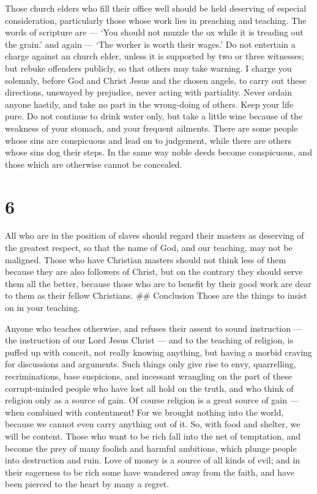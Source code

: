  Those church elders who fill their office well should be
held deserving of especial consideration, particularly those whose work
lies in preaching and teaching.  The words of scripture are
--- `You should not muzzle the ox while it is treading out the grain.'
and again --- `The worker is worth their wages.'  Do not
entertain a charge against an church elder, unless it is supported by
two or three witnesses;  but rebuke offenders publicly, so
that others may take warning.  I charge you solemnly,
before God and Christ Jesus and the chosen angels, to carry out these
directions, unswayed by prejudice, never acting with partiality.
 Never ordain anyone hastily, and take no part in the
wrong-doing of others. Keep your life pure.  Do not
continue to drink water only, but take a little wine because of the
weakness of your stomach, and your frequent ailments. 
There are some people whose sins are conspicuous and lead on to
judgement, while there are others whose sins dog their steps.
 In the same way noble deeds become conspicuous, and those
which are otherwise cannot be concealed.

\hypertarget{section-5}{%
\section{6}\label{section-5}}

 All who are in the position of slaves should regard their
masters as deserving of the greatest respect, so that the name of God,
and our teaching, may not be maligned.  Those who have
Christian masters should not think less of them because they are also
followers of Christ, but on the contrary they should serve them all the
better, because those who are to benefit by their good work are dear to
them as their fellow Christians. \#\# Conclusion Those are the things to
insist on in your teaching.

 Anyone who teaches otherwise, and refuses their assent to
sound instruction --- the instruction of our Lord Jesus Christ --- and
to the teaching of religion,  is puffed up with conceit, not
really knowing anything, but having a morbid craving for discussions and
arguments. Such things only give rise to envy, quarrelling,
recriminations, base suspicions,  and incessant wrangling on
the part of these corrupt-minded people who have lost all hold on the
truth, and who think of religion only as a source of gain. 
Of course religion is a great source of gain --- when combined with
contentment!  For we brought nothing into the world, because
we cannot even carry anything out of it.  So, with food and
shelter, we will be content.  Those who want to be rich fall
into the net of temptation, and become the prey of many foolish and
harmful ambitions, which plunge people into destruction and ruin.
 Love of money is a source of all kinds of evil; and in
their eagerness to be rich some have wandered away from the faith, and
have been pierced to the heart by many a regret.

